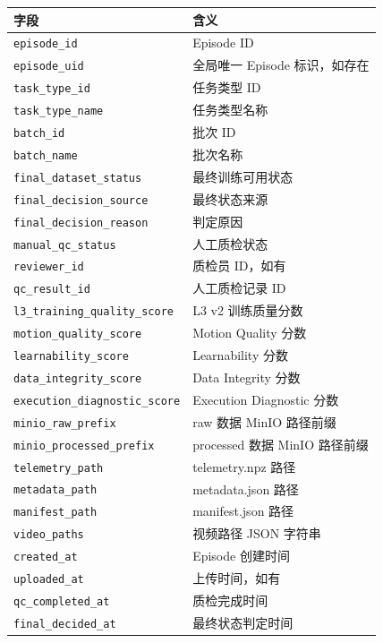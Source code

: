 \documentclass[UTF8,12pt,a4paper]{ctexart}
\begin{document}
\begin{longtable}{p{5cm}p{10cm}}
\toprule
字段 & 含义 \\
\midrule
\texttt{episode\_id} & Episode ID \\
\texttt{episode\_uid} & 全局唯一 Episode 标识，如存在 \\
\texttt{task\_type\_id} & 任务类型 ID \\
\texttt{task\_type\_name} & 任务类型名称 \\
\texttt{batch\_id} & 批次 ID \\
\texttt{batch\_name} & 批次名称 \\
\texttt{final\_dataset\_status} & 最终训练可用状态 \\
\texttt{final\_decision\_source} & 最终状态来源 \\
\texttt{final\_decision\_reason} & 判定原因 \\
\texttt{manual\_qc\_status} & 人工质检状态 \\
\texttt{reviewer\_id} & 质检员 ID，如有 \\
\texttt{qc\_result\_id} & 人工质检记录 ID \\
\texttt{l3\_training\_quality\_score} & L3 v2 训练质量分数 \\
\texttt{motion\_quality\_score} & Motion Quality 分数 \\
\texttt{learnability\_score} & Learnability 分数 \\
\texttt{data\_integrity\_score} & Data Integrity 分数 \\
\texttt{execution\_diagnostic\_score} & Execution Diagnostic 分数 \\
\texttt{minio\_raw\_prefix} & raw 数据 MinIO 路径前缀 \\
\texttt{minio\_processed\_prefix} & processed 数据 MinIO 路径前缀 \\
\texttt{telemetry\_path} & telemetry.npz 路径 \\
\texttt{metadata\_path} & metadata.json 路径 \\
\texttt{manifest\_path} & manifest.json 路径 \\
\texttt{video\_paths} & 视频路径 JSON 字符串 \\
\texttt{created\_at} & Episode 创建时间 \\
\texttt{uploaded\_at} & 上传时间，如有 \\
\texttt{qc\_completed\_at} & 质检完成时间 \\
\texttt{final\_decided\_at} & 最终状态判定时间 \\
\bottomrule
\end{longtable}
\end{document}
